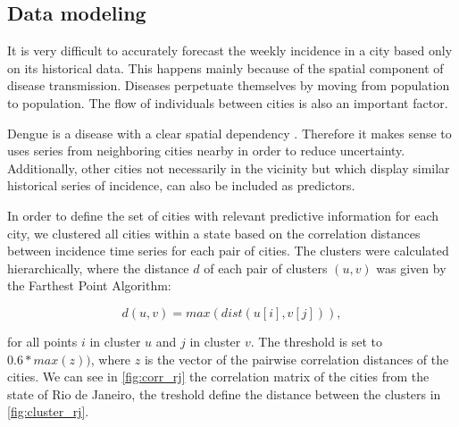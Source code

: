 \documentclass[12pt]{report}
\begin{document}
\subsection{Data modeling}

It is very difficult to accurately forecast the weekly incidence in a city based only on its historical data. This happens mainly because of the spatial component of disease transmission. Diseases perpetuate themselves by moving from population to population. The flow of individuals between cities is also an important factor.

Dengue is a disease with a clear spatial dependency \citep{stoddard2013house,eisen2009use}. Therefore it makes sense to uses series from neighboring cities nearby in order to reduce uncertainty. Additionally, other cities not necessarily in the vicinity but which display similar historical series of incidence, can also be included as predictors.

In order to define the set of cities with relevant predictive information for each city, we clustered all cities within a state based on the correlation distances between incidence time series for each pair of cities. The clusters were calculated hierarchically, where the distance $d$ of each pair of clusters $(u,v)$ was given by the Farthest Point Algorithm:

$$d(u,v) = max(dist(u[i],v[j])), $$

for all points $i$ in cluster $u$ and $j$ in cluster $v$. The threshold is set to $0.6*max(z))$, where $z$ is the vector of the pairwise correlation distances of the cities. We can see in  \ref{fig:corr_rj} the correlation matrix of the cities from the state of Rio de Janeiro, the treshold define the distance between the clusters in \ref{fig:cluster_rj}.
\end{document}
